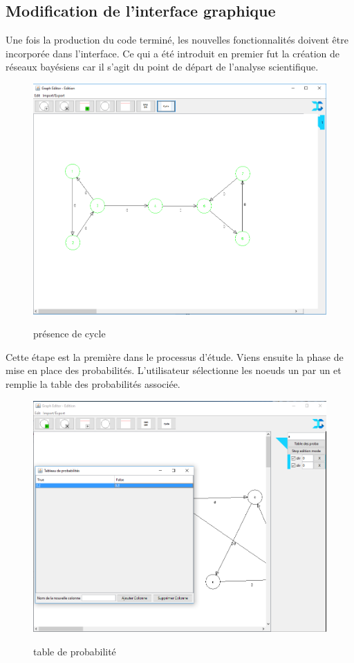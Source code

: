 \documentclass[conference]{IEEEtran}
\begin{document}
\subsection{Modification de l'interface graphique }

Une fois la production du code terminé, les nouvelles fonctionnalités doivent être incorporée dans l'interface. Ce qui a été introduit en premier fut la création de réseaux bayésiens car il s'agit du point de départ de l'analyse scientifique.

\begin{figure}[!h]
\includegraphics[scale=0.3]{Cycle.png}
\label{fig 2}
\caption{présence de cycle}
\end{figure}

Cette étape est la première dans le processus d'étude. Viens ensuite la phase de mise en place des probabilités. L'utilisateur sélectionne les noeuds un par un et remplie la table des probabilités associée.

\begin{figure}[!h]
\includegraphics[scale=0.3]{Proba.png}
\label{fig 3}
\caption{table de probabilité}
\end{figure}
\end{document}

